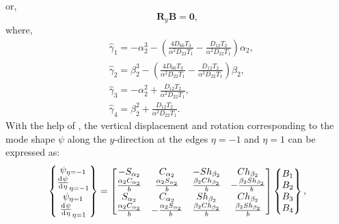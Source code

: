 \documentclass[preprint,12pt]{elsarticle}
\newcommand{\id}{\mathrm{d}\mkern1mu}
\begin{document}
%
or,
%
\begin{equation}\label{eq:ABy1}
	\mathbf{R}_y \mathbf{B} = \mathbf{0},
\end{equation}
%
where,
%
\begin{equation}\label{eq:gammay}
	\begin{split}
		&\hat{\gamma}_1=-\alpha_2^3-\left( \frac{4D_{66}T_3}{\alpha^2D_{22}T_1}  - \frac{D_{12}T_2}{\alpha^2D_{22}T_1}  \right)\alpha_2,\\
		&\hat{\gamma}_2=\beta_2^3-\left( \frac{4D_{66}T_3}{\alpha^2D_{22}T_1}  - \frac{D_{12}T_2}{\alpha^2D_{22}T_1}  \right)\beta_2,\\
		&\hat{\gamma}_3=-\alpha_2^2+\frac{D_{12}T_2}{\alpha^2D_{22}T_1},\\
		&\hat{\gamma}_4=\beta_2^2+\frac{D_{12}T_2}{\alpha^2D_{22}T_1}.
	\end{split}
\end{equation}
%
With the help of , the vertical displacement and rotation corresponding to the mode shape $\psi$ along the $y$-direction at the edges $\eta = -1$ and $\eta = 1$ can be expressed as:
%
\begin{equation}\label{eq:UBy}
	\begin{split}
		\begin{Bmatrix}
			\psi_{\eta=-1}\\\frac{\id \psi}{\id \eta}_{\eta=-1}\\\psi_{\eta=1}\\\frac{\id \psi}{\id \eta}_{\eta=1}
		\end{Bmatrix}
		= \begin{bmatrix}
			-S_{\alpha_2} & C_{\alpha_2} & -Sh_{\beta_2} & Ch_{\beta_2} \\
			\frac{\alpha_2 C_{\alpha_2}}{b} & \frac{\alpha_2 S_{\alpha_2}}{b} & \frac{\beta_2 Ch_{\beta_2}}{b} & -\frac{\beta_2 Sh_{\beta_2}}{b} \\
			S_{\alpha_2} & C_{\alpha_2} & Sh_{\beta_2} & Ch_{\beta_2} \\
			\frac{\alpha_2 C_{\alpha_2}}{b} & -\frac{\alpha_2 S_{\alpha_2}}{b} & \frac{\beta_2 Ch_{\beta_2}}{b} & \frac{\beta_2 Sh_{\beta_2}}{b}
		\end{bmatrix}
		\begin{Bmatrix}
			B_1\\B_2\\B_3\\B_4
		\end{Bmatrix},		
	\end{split}
\end{equation}
\end{document}
